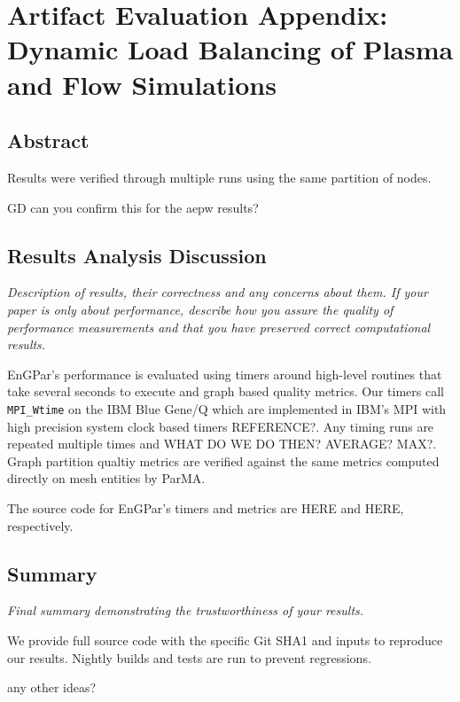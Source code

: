 \section{Artifact Evaluation Appendix: Dynamic Load Balancing of Plasma and Flow Simulations}

\subsection{Abstract}

Results were verified through multiple runs using the same partition of nodes.

{\color{red} GD can you confirm this for the aepw results?}


\subsection{Results Analysis Discussion}

{\em Description of results, their correctness and any concerns about them. If your paper is only about performance, describe how you assure the quality of performance measurements and that you have preserved correct computational results.}

EnGPar's performance is evaluated using timers around high-level routines that
take several seconds to execute and graph based quality metrics.
Our timers call \texttt{MPI\_Wtime} on the IBM Blue Gene/Q which are implemented
in IBM's MPI with high precision system clock based timers {\color{red}
REFERENCE?}.
Any timing runs are repeated multiple times and {\color{red} WHAT DO WE DO THEN? AVERAGE?
MAX?}.
Graph partition qualtiy metrics are verified against the same metrics computed
directly on mesh entities by ParMA.

The source code for EnGPar's timers and metrics are HERE and HERE, respectively.

\subsection{Summary}

{\em Final summary demonstrating the trustworthiness of your results.}

We provide full source code with the specific Git SHA1 and inputs to reproduce
our results.
Nightly builds and tests are run to prevent regressions.

{\color{red} any other ideas?}
